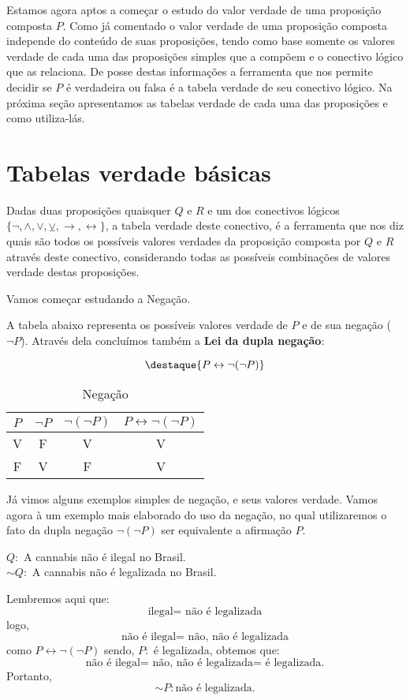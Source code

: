  Estamos agora aptos a começar o estudo do valor verdade de uma proposição composta $P$. Como já comentado o valor verdade de uma proposição composta independe do conteúdo de suas proposições, tendo como base somente os valores verdade de cada uma das proposições simples que a compõem e o conectivo lógico que as relaciona. De posse destas informações a ferramenta que nos permite decidir se $P$ é verdadeira ou falsa é a tabela verdade de seu conectivo lógico. Na próxima seção apresentamos as tabelas verdade de cada uma das proposições e como utiliza-lás.

\section{Tabelas verdade básicas}

 Dadas duas proposições quaisquer $Q$ e $R$ e um dos conectivos lógicos $\{\neg, \land, \lor, \veebar, \rightarrow, \leftrightarrow \}$, a tabela verdade deste conectivo, é a ferramenta que nos diz quais são todos os possíveis valores verdades da proposição composta por $Q$ e $R$ através deste conectivo, considerando todas as possíveis combinações de valores verdade destas proposições.

 Vamos começar estudando a Negação.

 A tabela abaixo representa os possíveis valores verdade de $P$ e de sua negação ($\neg P$). Através dela concluímos também a \textbf{Lei da dupla negação}:

  \[\destaque{P \leftrightarrow \neg(\neg P)}\]

 \begin{table}[H]
 \centering
 \begin{tabular}{|c|c|c|c|} \hline
 \rowcolor{cinza}
 $P$ & $\neg P$ & $\neg (\neg P)$ & $ P \leftrightarrow \neg (\neg P)$\\ \hline
 V & F & V & V \\ \hline
 F & V & F & V \\ \hline
 \end{tabular}
 \caption{Negação}
\end{table}

 Já vimos alguns exemplos simples de negação, e seus valores verdade. Vamos agora à um exemplo mais elaborado do uso da negação, no qual utilizaremos o fato da dupla negação $\neg(\neg P)$ ser equivalente a afirmação $P$.

 \begin{exem}
 $Q:$ A cannabis não é ilegal no Brasil.\\
 $\sim Q:$ A cannabis não é legalizada no Brasil.

 Lembremos aqui que:\\
   \[\text{ilegal= não é legalizada}\]
 logo,
   \[\text{não é ilegal= não, não é legalizada}\]
 como $P \leftrightarrow \neg(\neg P)$ sendo, $P:$ é legalizada, obtemos que:
   \[\text{não é ilegal= não, não é legalizada= é legalizada.}\]
 Portanto,
    \[\sim P:\text{não é legalizada.}\]

    \fim
 \end{exem}


